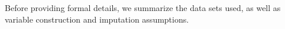 \noindent Before providing formal details, we summarize the data sets used, as well as variable construction and imputation assumptions.




%

